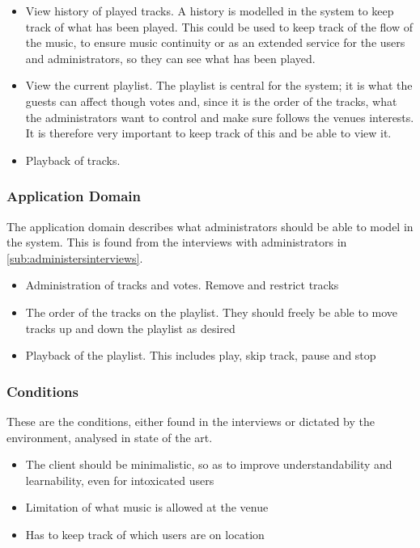 \begin{itemize}
    \item View history of played tracks. A history is modelled in the system to keep track of what has been played. This could be used to keep track of the flow of the music, to ensure music continuity or as an extended service for the users and administrators, so they can see what has been played.
		\item View the current playlist. The playlist is central for the system; it is what the guests can affect though votes and, since it is the order of the tracks, what the administrators want to control and make sure follows the venues interests. It is therefore very important to keep track of this and be able to view it.
    \item Playback of tracks.
\end{itemize}

\subsubsection{Application Domain}
The application domain describes what administrators should be able to model in the system. This is found from the interviews with administrators in \cref{sub:administersinterviews}.
\begin{itemize}
    \item Administration of tracks and votes. Remove and restrict tracks
    \item The order of the tracks on the playlist. They should freely be able to move tracks up and down the playlist as desired
    \item Playback of the playlist. This includes play, skip track, pause and stop
\end{itemize}

\subsubsection{Conditions}
These are the conditions, either found in the interviews or dictated by the environment, analysed in state of the art.
\begin{itemize}
  \item The client should be minimalistic, so as to improve understandability and learnability, even for intoxicated users
  \item Limitation of what music is allowed at the venue
  \item Has to keep track of which users are on location
\end{itemize}

